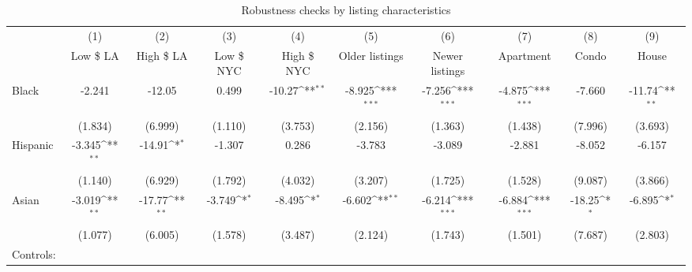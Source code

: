 \begin{landscape}

{
\def\sym#1{\ifmmode^{#1}\else\(^{#1}\)\fi}
\begin{longtable}{l*{9}{c}}
\caption{Robustness checks by listing characteristics}\\
\hline\hline\endfirsthead\hline\endhead\hline\endfoot\endlastfoot
                    &\multicolumn{1}{c}{(1)}&\multicolumn{1}{c}{(2)}&\multicolumn{1}{c}{(3)}&\multicolumn{1}{c}{(4)}&\multicolumn{1}{c}{(5)}&\multicolumn{1}{c}{(6)}&\multicolumn{1}{c}{(7)}&\multicolumn{1}{c}{(8)}&\multicolumn{1}{c}{(9)}\\
                    &\multicolumn{1}{c}{Low \$ LA}&\multicolumn{1}{c}{High \$ LA}&\multicolumn{1}{c}{Low \$ NYC}&\multicolumn{1}{c}{High \$ NYC}&\multicolumn{1}{c}{Older listings}&\multicolumn{1}{c}{Newer listings}&\multicolumn{1}{c}{Apartment}&\multicolumn{1}{c}{Condo}&\multicolumn{1}{c}{House}\\
\hline
Black               &      -2.241         &      -12.05         &       0.499         &      -10.27\sym{**} &      -8.925\sym{***}&      -7.256\sym{***}&      -4.875\sym{***}&      -7.660         &      -11.74\sym{**} \\
                    &     (1.834)         &     (6.999)         &     (1.110)         &     (3.753)         &     (2.156)         &     (1.363)         &     (1.438)         &     (7.996)         &     (3.693)         \\
[1em]
Hispanic            &      -3.345\sym{**} &      -14.91\sym{*}  &      -1.307         &       0.286         &      -3.783         &      -3.089         &      -2.881         &      -8.052         &      -6.157         \\
                    &     (1.140)         &     (6.929)         &     (1.792)         &     (4.032)         &     (3.207)         &     (1.725)         &     (1.528)         &     (9.087)         &     (3.866)         \\
[1em]
Asian               &      -3.019\sym{**} &      -17.77\sym{**} &      -3.749\sym{*}  &      -8.495\sym{*}  &      -6.602\sym{**} &      -6.214\sym{***}&      -6.884\sym{***}&      -18.25\sym{*}  &      -6.895\sym{*}  \\
                    &     (1.077)         &     (6.005)         &     (1.578)         &     (3.487)         &     (2.124)         &     (1.743)         &     (1.501)         &     (7.687)         &     (2.803)         \\
\hline
Controls:        \\

\end{longtable}}
\end{landscape}
